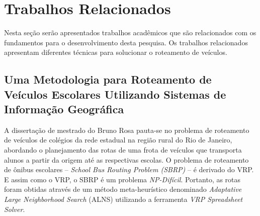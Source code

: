 \section{Trabalhos Relacionados}
\label{relacionados}
Nesta seção serão apresentados trabalhos acadêmicos que são relacionados com os fundamentos para o desenvolvimento desta pesquisa. Os trabalhos relacionados apresentam diferentes técnicas para solucionar o roteamento de veículos.

\subsection{Uma Metodologia para Roteamento de Veículos Escolares Utilizando Sistemas de Informação Geográfica}

A dissertação de mestrado do Bruno Rosa pauta-se no problema de roteamento de veículos de colégios da rede estadual na região rural do Rio de Janeiro, abordando o planejamento das rotas de uma frota de veículos que transporta alunos a partir da origem até as respectivas escolas. O problema de roteamento de ônibus escolares -- \emph{School Bus Routing Problem (SBRP)} -- é derivado do VRP. E assim como o VRP, o SBRP é um problema \emph{NP-Difícil}. Portanto, as rotas foram obtidas através de um método meta-heurístico denominado \emph{Adaptative Large Neighborhood Search} (ALNS) utilizando a ferramenta \emph{VRP Spreadsheet Solver}.

